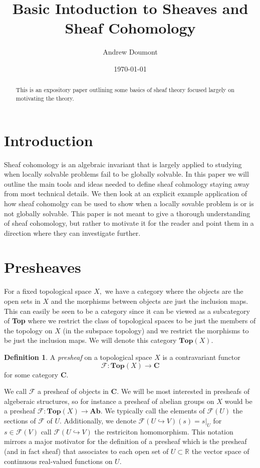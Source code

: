 \documentclass[psamsfonts]{amsart}
\title{Basic Intoduction to Sheaves and Sheaf Cohomology}
\author{Andrew Doumont}
\date{\today}
\theoremstyle{definition}
\newtheorem{defn}[thm]{Definition}
\theoremstyle{remark}
\numberwithin{equation}{section}
\begin{document}
\begin{abstract}
  This is an expository paper outlining some basics of sheaf theory focused largely on motivating the theory.
  
  
\end{abstract}

\maketitle




\tableofcontents



\section{Introduction}
  Sheaf cohomology is an algebraic invariant that is largely applied to studying when locally solvable problems fail to be globally solvable. In this paper we will outline the main tools and ideas needed to define sheaf cohmology staying away from most technical details. We then look at an explicit example application of how sheaf cohomolgy can be used to show when a locally sovable problem is or is not globally solvable. This paper is not meant to give a thorough understanding of sheaf cohomology, but rather to motivate it for the reader and point them in a direction where they can investigate further.


\section{Presheaves}
  For a fixed topological space $X,$ we have a category where the objects are the open sets in $X$ and the morphisms between objects are just the inclusion maps. This can easily be seen to be a category since it can be viewed as a subcategory of 
  \textbf{Top} where we restrict the class of topological spaces to be just the members of the topology on $X$ (in the subspace topology) and we restrict the morphisms to be just the inclusion maps. We will denote this category $\textbf{Top}(X).$ \cite{hartshorne_1977}
  
  \begin{defn}
    A \textit{presheaf} on a topological space $X$ is a contravariant functor 
    \[\mathscr{F}: \textbf{Top}(X) \to \textbf{C}\]
    for some category $\textbf{C}.$
  \end{defn}
   We call $\mathscr{F}$ a presheaf of objects in \textbf{C}. \cite{hartshorne_1977} We will be most interested in presheafs of algeberaic structures, so for instance a presheaf of abelian groups on $X$ would be a presheaf $\mathscr{F}:\textbf{Top}(X) \to \textbf{Ab}$. We typically call the elements of $\mathscr{F}(U)$ the sections of $\mathscr{F}$ of $U.$ Additionally, we denote $\mathscr{F}(U \hookrightarrow V)(s) = s|_U$ for $s \in \mathscr{F}(V)$ call $\mathscr{F}(U \hookrightarrow V)$ the restriciton homomorphism. This notation mirrors a major motivator for the definition of a presheaf which is the presheaf (and in fact sheaf) that associates to each open set of $U \subset \mathbb{R}$ the vector space of continuous real-valued functions on $U.$ 
\end{document}
